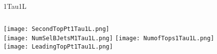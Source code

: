 \documentclass{beamer}
\begin{document}
\begin{frame}{1Tau1L}
    \begin{columns}[t]
    \centering
    \texttt{[image: SecondTopPt1Tau1L.png]}\\
    \texttt{[image: NumSelBJetsM1Tau1L.png]}
    \centering
    \texttt{[image: NumofTops1Tau1L.png]}\\
    \texttt{[image: LeadingTopPt1Tau1L.png]}
    \end{columns}
\end{frame}
\end{document}
